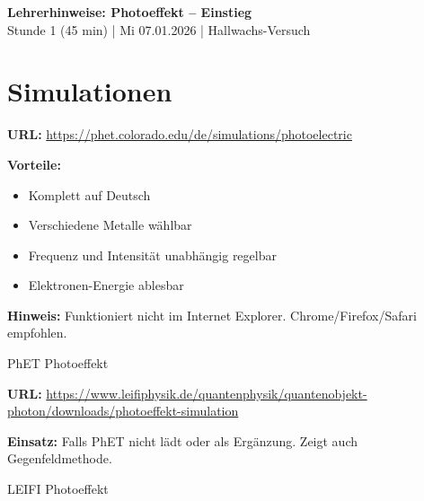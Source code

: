 \documentclass[11pt,a4paper]{article}
\begin{document}
\begin{center}
{\Large\textbf{Lehrerhinweise: Photoeffekt -- Einstieg}}\\[0.3em]
{\normalsize Stunde 1 (45 min) | Mi 07.01.2026 | Hallwachs-Versuch}
\end{center}

\vspace{0.5em}


\section*{Simulationen}

\begin{tcolorbox}[infobox={Haupt-Simulation: PhET Photoeffekt (Deutsch)}]
\begin{minipage}{0.7\textwidth}
\textbf{URL:} \url{https://phet.colorado.edu/de/simulations/photoelectric}

\textbf{Vorteile:}
\begin{itemize}[nosep]
\item Komplett auf Deutsch
\item Verschiedene Metalle wählbar
\item Frequenz und Intensität unabhängig regelbar
\item Elektronen-Energie ablesbar
\end{itemize}

\textbf{Hinweis:} Funktioniert nicht im Internet Explorer. Chrome/Firefox/Safari empfohlen.
\end{minipage}
\hfill
\begin{minipage}{0.25\textwidth}
\centering
{}

\vspace{0.2cm}
{\scriptsize PhET Photoeffekt}
\end{minipage}
\end{tcolorbox}

\vspace{0.5em}

\begin{tcolorbox}[infobox={Alternative 1: LEIFI Photoeffekt}]
\begin{minipage}{0.7\textwidth}
\textbf{URL:} \url{https://www.leifiphysik.de/quantenphysik/quantenobjekt-photon/downloads/photoeffekt-simulation}

\textbf{Einsatz:} Falls PhET nicht lädt oder als Ergänzung. Zeigt auch Gegenfeldmethode.
\end{minipage}
\hfill
\begin{minipage}{0.25\textwidth}
\centering
{}

\vspace{0.2cm}
{\scriptsize LEIFI Photoeffekt}
\end{minipage}
\end{tcolorbox}
\end{document}
